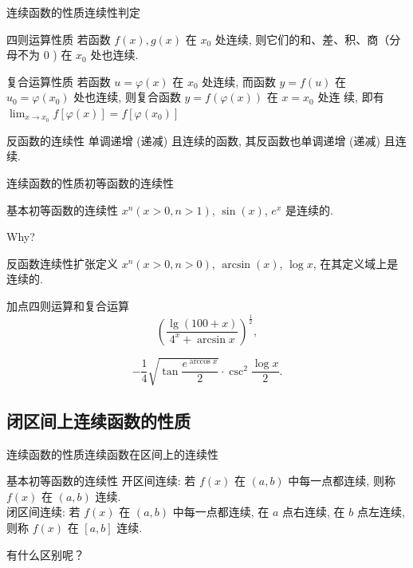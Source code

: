 \documentclass[
10pt,
aspectratio=43,
]{beamer}
\begin{document}
\begin{frame}{连续函数的性质}{连续性判定}
	\begin{exampleblock}{四则运算性质}
		若函数 $f(x), g(x)$ 在 $x_0$ 处连续, 则它们的和、差、积、商（分 母不为 0 ) 在 $x_0$ 处也连续.
	\end{exampleblock}
	\pause
	\begin{exampleblock}{复合运算性质}
		若函数 $u=\varphi(x)$ 在 $x_0$ 处连续, 而函数 $y=f(u)$ 在 $u_0=\varphi\left(x_0\right)$ 处也连续, 则复合函数 $y=f(\varphi(x))$ 在 $x=x_0$ 处连 续, 即有 $\lim _{x \rightarrow x_0} f[\varphi(x)]=f\left[\varphi\left(x_0\right)\right]$
	
	\end{exampleblock}
	\pause
	\begin{exampleblock}{反函数的连续性}
		单调递增 (递减) 且连续的函数, 其反函数也单调递增 (递减) 且连续.
	\end{exampleblock}
	
\end{frame}

\begin{frame}{连续函数的性质}{初等函数的连续性}
	\begin{block}{基本初等函数的连续性}
		$x^n (x>0,n>1)$, $\sin(x)$, $e^x$ 是连续的.
	\end{block}
	Why?
	\pause
	\begin{exampleblock}{反函数连续性扩张定义}
		$x^n (x>0,n>0)$, $\arcsin(x)$, $\log{x}$, 在其定义域上是连续的.
	\end{exampleblock}
	\pause
	\begin{exampleblock}{加点四则运算和复合运算}
		\[\left(\frac{\lg (100+x)}{4^x+\arcsin x}\right)^{\frac{1}{2}},\]

		\[-\frac{1}{4} \sqrt{\tan \frac{e^{\arccos x}}{2}} \cdot \csc ^2 \frac{\log x}{2}.\]
	\end{exampleblock}
	
\end{frame}

\subsection{闭区间上连续函数的性质}
\begin{frame}{连续函数的性质}{连续函数在区间上的连续性}
	\begin{block}{基本初等函数的连续性}
		开区间连续: 若 $f(x)$ 在 $(a, b)$ 中每一点都连续, 则称 $f(x)$ 在 $(a, b)$ 连续.\pause \\
		闭区间连续: 若 $f(x)$ 在 $(a, b)$ 中每一点都连续, 在 $a$ 点右连续, 在 $b$ 点左连续, 则称 $f(x)$ 在 $[a, b]$ 连续.
	\end{block}
	\pause 有什么区别呢？
\end{frame}
\end{document}
